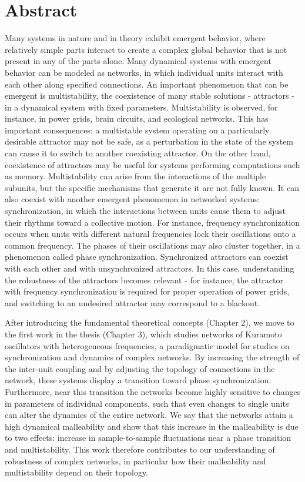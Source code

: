 \section*{Abstract}

Many systems in nature and in theory exhibit emergent behavior, where relatively simple parts interact to create a complex global behavior that is not present in any of the parts alone. Many dynamical systems with emergent behavior can be modeled as networks, in which individual units interact with each other along specified connections. An important phenomenon that can be emergent is multistability, the coexistence of many stable solutions - attractors - in a dynamical system with fixed parameters. Multistability is observed, for instance, in power grids, brain circuits, and ecological networks. This has important consequences: a multistable system operating on a particularly desirable attractor may not be safe, as a perturbation in the state of the system can cause it to switch to another coexisting attractor. On the other hand, coexistence of attractors may be useful for systems performing computations such as memory. Multistability can arise from the interactions of the multiple subunits, but the specific mechanisms that generate it are not fully known. It can also coexist with another emergent phenomenon in networked systems: synchronization, in which the interactions between units cause them to adjust their rhythms toward a collective motion. For instance, frequency synchronization occurs when units with different natural frequencies lock their oscillations onto a common frequency. The phases of their oscillations may also cluster together, in a phenomenon called phase synchronization.  Synchronized attractors can coexist with each other and with unsynchronized attractors. In this case, understanding the robustness of the attractors becomes relevant - for instance, the attractor with frequency synchronization is required for proper operation of power grids, and switching to an undesired attractor may correspond to a blackout. 

After introducing the fundamental theoretical concepts (Chapter 2), we move to the first work in the thesis (Chapter 3), which studies networks of Kuramoto oscillators with heterogeneous frequencies, a paradigmatic model for studies on synchronization and dynamics of complex networks. By increasing the strength of the inter-unit coupling and by adjusting the topology of connections in the network, these systems display a transition toward phase synchronization. Furthermore, near this transition the networks become highly sensitive to changes in parameters of individual components, such that even changes to single units can alter the dynamics of the entire network. We say that the networks attain a high dynamical malleability and show that this increase in the malleability is due to two effects: increase in sample-to-sample fluctuations near a phase transition and multistability. This work therefore contributes to our understanding of robustness of complex networks, in particular how their malleability and multistability depend on their topology. 

